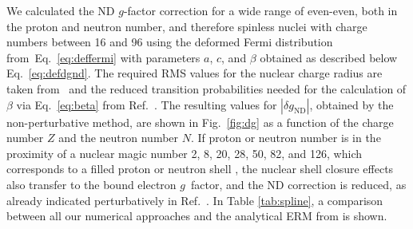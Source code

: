 We calculated the ND $g$-factor correction for a wide range of even-even, both in the proton and neutron number, and therefore spinless nuclei with charge numbers between 16 and 96 using the deformed Fermi distribution from~Eq.~\eqref{eq:deffermi} with parameters $a$, $c$, and $\beta$ obtained as described below Eq.~\eqref{eq:defdgnd}. The required RMS values for the nuclear charge radius are taken from~\cite{Angeli2013} and the reduced transition probabilities needed for the calculation of $\beta$ via Eq.~\eqref{eq:beta} from Ref.~\cite{ENSDF}. The resulting values for $|\delta g_{\text{ND}}|$, obtained by the non-perturbative method, are shown in Fig.~\ref{fig:dg} as a function of the charge number $Z$ and the neutron number $N$. If proton or neutron number is in the proximity of a nuclear magic number 2, 8, 20, 28, 50, 82, and 126, which corresponds to a filled proton or neutron shell \cite{Ring}, the nuclear shell closure effects also transfer to the bound electron $g$~factor, and the ND correction is reduced, as already indicated perturbatively in Ref.~\cite{michel2015}. In Table \ref{tab:spline}, a comparison between all our numerical approaches and the analytical ERM from \cite{jacek2012} is shown.

